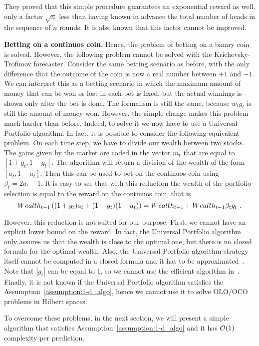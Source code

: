 They proved that this simple procedure guarantees an exponential reward as well, only a factor $\sqrt{n}$ less than having known in advance the total number of heads in the sequence of $n$ rounds. It is also known that this factor cannot be improved.

\textbf{Betting on a continuos coin.}
Hence, the problem of betting on a binary coin is solved. However, the following problem cannot be solved with the Krichevsky-Trofimov forecaster. Consider the same betting scenario as before, with the only difference that the outcome of the coin is now a real number between $+1$ and $-1$. We can interpret this as a betting scenario in which the maximum amount of money that can be won or lost in each bet is fixed, but the actual winnings is shown only after the bet is done. The formalism is still the same, because $w_t g_t$ is still the amount of money won. However, the simple change makes this problem much harder than before. Indeed, to solve it we now have to use a Universal Portfolio algorithm. In fact, it is possible to consider the following equivalent problem. On each time step, we have to divide our wealth between two stocks. The gains given by the market are coded in the vector $m_t$ that are equal to $[1+g_t, 1-g_t]$. The algorithm will return a division of the wealth of the form $[a_t, 1-a_t]$. Then this can be used to bet on the continuos coin using $\beta_t=2 a_t-1$.
It is easy to see that with this reduction the wealth of the portfolio selection is equal to the reward on the continuos coin, that is
\[
Wealth_{t-1} \left((1+g_t) a_t+(1-g_t)(1-a_t)\right)=Wealth_{t-1}+Wealth_{t-1} \beta_t g_t~.
\]

However, this reduction is not suited for our purpose.
First, we cannot have an explicit lower bound on the reward. In fact, the Universal Portfolio algorithm only assures us that the wealth is close to the optimal one, but there is no closed formula for the optimal wealth.
Also, the Universal Portfolio algorithm strategy itself cannot be computed in a closed formula and it has to be approximated~\cite{KalaiV03}. Note that $|g_t|$ can be equal to 1, so we cannot use the efficient algorithm in~\cite{HazanAK07}.
Finally, it is not known if the Universal Portfolio algorithm satisfies the Assumption~\ref{assumption:1-d_algo}, hence we cannot use it to solve \ac{OLO}/\ac{OCO} problems in Hilbert spaces.

To overcome these problems, in the next section, we will present a simple algorithm that satisfies Assumption~\ref{assumption:1-d_algo} and it has $\mathcal{O}(1)$ complexity per prediction.
